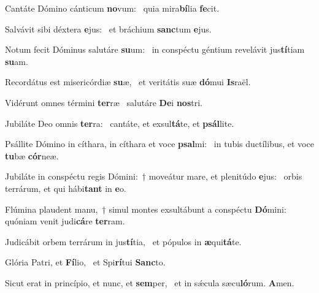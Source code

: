 \item Cantáte Dómino cánticum \textbf{no}vum:~\psstar{} quia mira\textbf{bí}lia \textbf{fe}cit.
\item Salvávit sibi déxtera \textbf{e}jus:~\psstar{} et bráchium \textbf{sanc}tum \textbf{e}jus.
\item Notum fecit Dóminus salutáre \textbf{su}um:~\psstar{} in conspéctu géntium revelávit jus\textbf{tí}tiam \textbf{su}am.
\item Recordátus est misericórdiæ \textbf{su}æ,~\psstar{} et veritátis suæ \textbf{dó}mui \textbf{Is}raël.
\item Vidérunt omnes términi \textbf{ter}ræ~\psstar{} salutáre \textbf{De}i \textbf{nos}tri.
\item Jubiláte Deo omnis \textbf{ter}ra:~\psstar{} cantáte, et exsul\textbf{tá}te, et \textbf{psál}lite.
\item Psállite Dómino in cíthara, in cíthara et voce \textbf{psal}mi:~\psstar{} in tubis ductílibus, et voce \textbf{tu}bæ \textbf{cór}neæ.
\item Jubiláte in conspéctu regis Dómini:~† moveátur mare, et plenitúdo \textbf{e}jus:~\psstar{} orbis terrárum, et qui hábi\textbf{tant} in \textbf{e}o.
\item Flúmina plaudent manu,~† simul montes exsultábunt a conspéctu \textbf{Dó}mini:~\psstar{} quóniam venit judi\textbf{cá}re \textbf{ter}ram.
\item Judicábit orbem terrárum in jus\textbf{tí}tia,~\psstar{} et pópulos in \textbf{æ}qui\textbf{tá}te.
\item Glória Patri, et \textbf{Fí}lio,~\psstar{} et Spi\textbf{rí}tui \textbf{Sanc}to.
\item Sicut erat in princípio, et nunc, et \textbf{sem}per,~\psstar{} et in sǽcula sæcu\textbf{ló}rum. \textbf{A}men.
